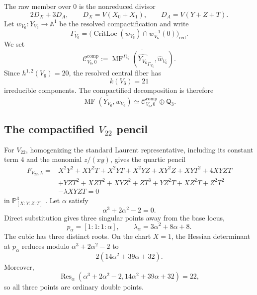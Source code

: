 \documentclass[11pt]{amsart}
\theoremstyle{definition}
\theoremstyle{remark}
\DeclareMathOperator{\MF}{MF}
\DeclareMathOperator{\CritLoc}{CritLoc}
\newcommand{\MorseCat}[1]{\mathsf{Q}_{#1}}
\newcommand{\CcompVsix}{\mathcal C^{\mathrm{comp}}_{V_6,0}}
\begin{document}
The raw member over $0$ is the nonreduced divisor
\begin{equation}
\label{eq:V6_raw_central_member}
2D_X+3D_A,
\qquad
D_X=V(X_0+X_1),\qquad D_A=V(Y+Z+T).
\end{equation}
Let $w_{V_6}:Y_{V_6}\to\mathbb A^1$ be the resolved compactification and
write
\[
\Gamma_{V_6}
=\bigl(\CritLoc(w_{V_6})\cap w_{V_6}^{-1}(0)\bigr)_{\mathrm{red}}.
\]
We set
\begin{equation}
\label{eq:V6_compact_central_category}
\CcompVsix
:=
\overline{\MF^{\Gamma_{V_6}}
(\widehat{Y_{V_6}}_{\Gamma_{V_6}},\widehat w_{V_6})}.
\end{equation}
Since $h^{1,2}(V_6)=20$, the resolved central fiber has
\begin{equation}
\label{eq:V6_component_count}
k(V_6)=21
\end{equation}
irreducible components.  The compactified decomposition is therefore
\begin{equation}
\label{eq:V6_compact_final_decomposition}
\overline{\MF(Y_{V_6},w_{V_6})}
\simeq
\CcompVsix\oplus\MorseCat{3}.
\end{equation}

\subsection{The compactified \texorpdfstring{$V_{22}$}{V22} pencil}

For $V_{22}$, homogenizing the standard Laurent representative, including
its constant term $4$ and the monomial $z/(xy)$, gives the quartic pencil
\begin{equation}
\label{eq:V22_compact_pencil}
\begin{aligned}
F_{V_{22},\lambda}={}&
X^2Y^2+XY^2T+X^2YT+X^2YZ+XY^2Z+XYT^2+4XYZT\\
&+YZT^2+XZT^2+XYZ^2+ZT^3+YZ^2T+XZ^2T+Z^2T^2\\
&-\lambda XYZT=0
\end{aligned}
\end{equation}
in $\mathbb P^3_{[X:Y:Z:T]}$
\cite{PrzyjalkowskiWeak,Przyjalkowski2026}.  Let $\alpha$ satisfy
\[
\alpha^3+2\alpha^2-2=0.
\]
Direct substitution gives three singular points away from the base locus,
\begin{equation}
\label{eq:V22_visible_nodes}
p_\alpha=[1:1:1:\alpha],
\qquad
\lambda_\alpha=3\alpha^2+8\alpha+8.
\end{equation}
The cubic has three distinct roots.  On the chart $X=1$, the Hessian
determinant at $p_\alpha$ reduces modulo
$\alpha^3+2\alpha^2-2$ to
\begin{equation}
\label{eq:V22_visible_hessian}
2(14\alpha^2+39\alpha+32).
\end{equation}
Moreover,
\[
\operatorname{Res}_\alpha
(\alpha^3+2\alpha^2-2,14\alpha^2+39\alpha+32)=22,
\]
so all three points are ordinary double points.
\end{document}
